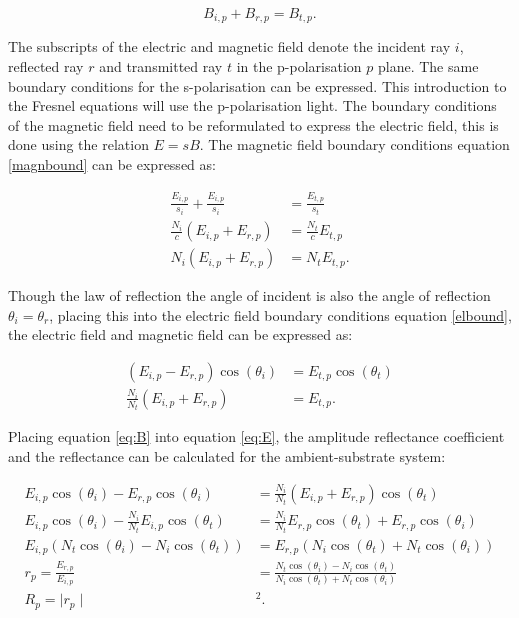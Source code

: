 \documentclass[MasterThesisMain.tex]{subfiles}
\begin{document}
\begin{equation} \label{magnbound}
B_{i,p} + B_{r,p} = B_{t,p}.
\end{equation}

The subscripts of the electric and magnetic field denote the incident ray $i$, reflected ray $r$ and transmitted ray $t$ in the p-polarisation $p$ plane. The same boundary conditions for the s-polarisation can be expressed. This introduction to the Fresnel equations will use the p-polarisation light. The boundary conditions of the magnetic field need to be reformulated to express the electric field, this is done using the relation $E=sB$. The magnetic field boundary conditions equation \ref{magnbound} can be expressed as:

\begin{align}
\frac{E_{i,p}}{s_i} + \frac{E_{i,p}}{s_i} &= \frac{E_{t,p}}{s_t}\\
\frac{N_i}{c}(E_{i,p}+E_{r,p}) &= \frac{N_t}{c}E_{t,p}\\
N_i(E_{i,p}+E_{r,p}) &= N_tE_{t,p}.
\end{align} 

Though the law of reflection the angle of incident is also the angle of reflection $\theta_i=\theta_r$, placing this into the electric field boundary conditions equation \ref{elbound}, the electric field and magnetic field can be expressed as:

\begin{align}
(E_{i,p}-E_{r,p})\cos(\theta_i) &= E_{t,p}\cos(\theta_t) \label{eq:E}\\
\frac{N_i}{N_t}(E_{i,p}+E_{r,p}) &= E_{t,p}. \label{eq:B}
\end{align}

Placing equation \ref{eq:B} into equation \ref{eq:E}, the amplitude reflectance coefficient and the reflectance can be calculated for the ambient-substrate system:

\begin{align}
E_{i,p}\cos(\theta_i)-E_{r,p}\cos(\theta_i) &= \frac{N_i}{N_t}(E_{i,p}+E_{r,p}) \cos(\theta_t) \\
E_{i,p}\cos(\theta_i) - \frac{N_i}{N_t}E_{i,p} \cos(\theta_t) &= \frac{N_i}{N_t}E_{r,p} \cos(\theta_t) + E_{r,p} \cos(\theta_i)\\
E_{i,p}(N_t\cos(\theta_i)-N_i\cos(\theta_t)) &= E_{r,p}(N_i\cos(\theta_t)+N_t\cos(\theta_i))\\
r_p = \frac{E_{r,p}}{E_{i,p}} &= \frac{N_t\cos(\theta_i)-N_i\cos(\theta_t)}{N_i\cos(\theta_t)+N_t\cos(\theta_i)} \label{eq:a-srefl}\\
R_p = \mid r_p \mid &^2.
\end{align}
\end{document}
